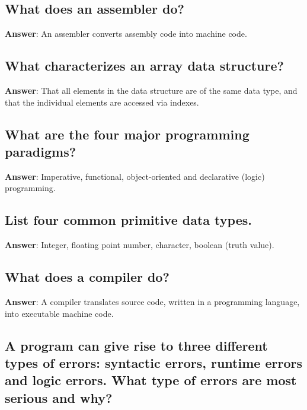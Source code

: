 \documentclass[a4paper,11pt,oneside]{article}
\begin{document}
\begin{sloppypar}
\subsection{What does an assembler do?}

\label{q:197:sa:en:True}

\textbf{Answer}: An assembler converts assembly code into machine code.



\subsection{What characterizes an array data structure?}

\label{q:198:sa:en:True}

\textbf{Answer}: That all elements in the data structure are of the same data type, and that the individual elements are accessed via indexes.



\subsection{What are the four major programming paradigms?}

\label{q:199:sa:en:True}

\textbf{Answer}: Imperative, functional, object-oriented and declarative (logic) programming.



\subsection{List four common primitive data types.}

\label{q:200:sa:en:True}

\textbf{Answer}: Integer, floating point number, character, boolean (truth value).



\subsection{What does a compiler do?}

\label{q:201:sa:en:True}

\textbf{Answer}: A compiler translates source code, written in a programming language, into executable machine code.



\subsection{A program can give rise to three different types of errors: syntactic errors, runtime errors and logic errors. What type of errors are most serious and why?}


\end{sloppypar}
\end{document}
